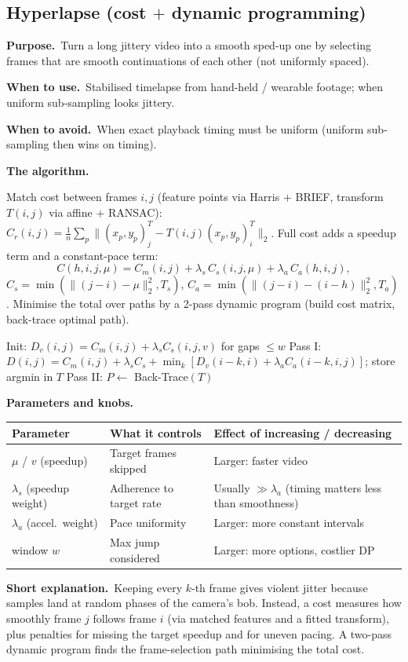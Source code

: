 \documentclass[10pt]{article}
\makeatletter
\newcommand{\Purpose}{\par\smallskip\textbf{Purpose.}\ }
\newcommand{\WhenUse}{\par\textbf{When to use.}\ }
\newcommand{\WhenAvoid}{\par\textbf{When to avoid.}\ }
\newcommand{\TheAlgo}{\par\smallskip\textbf{The algorithm.}\par\nopagebreak}
\newcommand{\Knobs}{\par\smallskip\textbf{Parameters and knobs.}\par\nopagebreak}
\newcommand{\ShortExp}{\par\smallskip\textbf{Short explanation.}\ }
\newenvironment{ptable}{\begin{center}\small\begin{tabular}{@{}p{2.5cm} p{5.9cm} p{6.2cm}@{}}\toprule
Parameter & What it controls & Effect of increasing / decreasing \\ \midrule}
{\bottomrule\end{tabular}\end{center}}
\makeatother
\begin{document}
\subsection{Hyperlapse (cost $+$ dynamic programming)}
\Purpose Turn a long jittery video into a smooth sped-up one by selecting frames that are smooth
continuations of each other (not uniformly spaced).
\WhenUse Stabilised timelapse from hand-held / wearable footage; when uniform sub-sampling looks jittery.
\WhenAvoid When exact playback timing must be uniform (uniform sub-sampling then wins on timing).
\TheAlgo Match cost between frames $i,j$ (feature points via Harris $+$ BRIEF, transform $T(i,j)$ via
affine $+$ RANSAC): $C_r(i,j)=\frac1n\sum_p\|(x_p,y_p)_j^T-T(i,j)(x_p,y_p)_i^T\|_2$. Full cost adds a
speedup term and a constant-pace term:
\[
C(h,i,j,\mu)=C_m(i,j)+\lambda_s\,C_s(i,j,\mu)+\lambda_a\,C_a(h,i,j),
\]
$C_s=\min(\|(j-i)-\mu\|_2^2,T_s)$, $C_a=\min(\|(j-i)-(i-h)\|_2^2,T_a)$. Minimise the total over paths by a
2-pass dynamic program (build cost matrix, back-trace optimal path).

\begin{algorithm}[H]
\SetAlgoLined
{}
Init: $D_v(i,j)=C_m(i,j)+\lambda_s C_s(i,j,v)$ for gaps $\le w$\;
Pass I: $D(i,j)=C_m(i,j)+\lambda_sC_s+\min_k[D_v(i{-}k,i)+\lambda_aC_a(i{-}k,i,j)]$; store argmin in $T$\;
Pass II: $P\leftarrow$ Back-Trace$(T)$\;
\caption{Hyperlapse frame selection (DP)}
\end{algorithm}

\Knobs
\begin{ptable}
$\mu$ / $v$ (speedup) & Target frames skipped & Larger: faster video \\
$\lambda_s$ (speedup weight) & Adherence to target rate & Usually $\gg\lambda_a$ (timing matters less than smoothness) \\
$\lambda_a$ (accel.\ weight) & Pace uniformity & Larger: more constant intervals \\
window $w$ & Max jump considered & Larger: more options, costlier DP \\
\end{ptable}
\ShortExp Keeping every $k$-th frame gives violent jitter because samples land at random phases of the
camera's bob. Instead, a cost measures how smoothly frame $j$ follows frame $i$ (via matched features and a
fitted transform), plus penalties for missing the target speedup and for uneven pacing. A two-pass dynamic
program finds the frame-selection path minimising the total cost.
\end{document}
